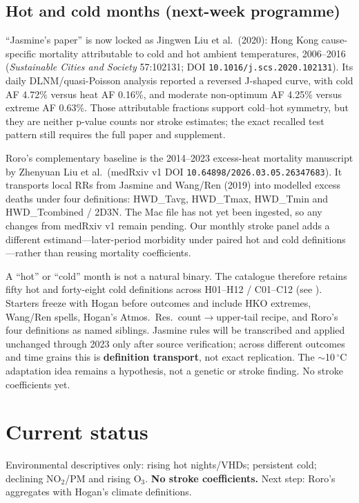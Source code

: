\documentclass[11pt,a4paper]{article}
\begin{document}
\subsection{Hot and cold months (next-week programme)}
``Jasmine's paper'' is now locked as Jingwen Liu et al.\ (2020): Hong Kong cause-specific mortality attributable to cold and hot ambient temperatures, 2006--2016 (\emph{Sustainable Cities and Society} 57:102131; DOI \nolinkurl{10.1016/j.scs.2020.102131}). Its daily DLNM/quasi-Poisson analysis reported a reversed J-shaped curve, with cold AF 4.72\% versus heat AF 0.16\%, and moderate non-optimum AF 4.25\% versus extreme AF 0.63\%. Those attributable fractions support cold--hot symmetry, but they are neither p-value counts nor stroke estimates; the exact recalled test pattern still requires the full paper and supplement.

Roro's complementary baseline is the 2014--2023 excess-heat mortality manuscript by Zhenyuan Liu et al.\ (medRxiv v1 DOI \nolinkurl{10.64898/2026.03.05.26347683}). It transports local RRs from Jasmine and Wang/Ren (2019) into modelled excess deaths under four definitions: HWD\_Tavg, HWD\_Tmax, HWD\_Tmin and HWD\_Tcombined / 2D3N. The Mac file  has not yet been ingested, so any changes from medRxiv v1 remain pending. Our monthly stroke panel adds a different estimand---later-period morbidity under paired hot and cold definitions---rather than reusing mortality coefficients.

A ``hot'' or ``cold'' month is not a natural binary. The catalogue therefore retains fifty hot and forty-eight cold definitions across H01--H12 / C01--C12 (see ). Starters freeze with Hogan before outcomes and include HKO extremes, Wang/Ren spells, Hogan's Atmos.\ Res.\ count$\to$upper-tail recipe, and Roro's four definitions as named siblings. Jasmine rules will be transcribed and applied unchanged through 2023 only after source verification; across different outcomes and time grains this is \textbf{definition transport}, not exact replication. The $\sim$10\,$^\circ$C adaptation idea remains a hypothesis, not a genetic or stroke finding. No stroke coefficients yet.

\section{Current status}
Environmental descriptives only: rising hot nights/VHDs; persistent cold; declining NO$_2$/PM and rising O$_3$. \textbf{No stroke coefficients.} Next step: Roro's aggregates with Hogan's climate definitions.
\end{document}
